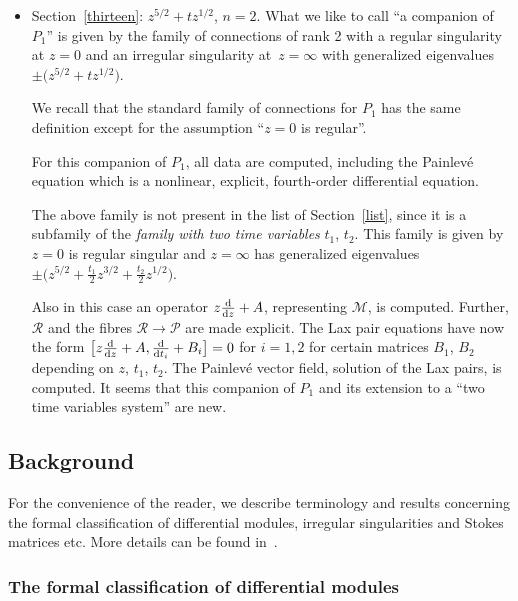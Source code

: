 \documentclass[10pt,a4paper]{amsart}
\numberwithin{equation}{section}
\begin{document}
\begin{itemize}
 For $n=3$, we claim an identification with an item in the classification
 by Kawakami~\cite[p.~35]{K3}.

\item Section~\ref{thirteen}: $z^{5/2}+tz^{1/2}$, $n=2$.
What we like to call ``a companion of $P_1$'' is given by the family of connections of rank 2 with a regular singularity
at $z=0$ and an irregular singularity at~${z=\infty}$ with generalized eigenvalues $\pm \bigl(z^{5/2}+tz^{1/2}\bigr)$.

We recall that the standard family of connections for $P_1$ has the same definition except for the assumption
``$z=0$ is regular''.

 For this companion of $P_1$, all data are computed, including the Painlev\'e equation which is a nonlinear, explicit,
 fourth-order differential equation.

 The above family is not present in the list of Section~\ref{list}, since it is a subfamily of the {\it family
 with two time variables } $t_1$, $t_2$. This family is given by $z=0$ is regular singular and $z=\infty$ has generalized eigenvalues $\pm \bigl( z^{5/2}+\frac{t_1}{2}z^{3/2}+\frac{t_2}{2}z^{1/2} \bigr)$.

 Also in this case an operator $z\frac{{\rm d}}{{\rm d}z}+A$, representing $\mathcal{M}$, is computed. Further, $\mathcal{R}$ and the fibres $\mathcal{R}\rightarrow \mathcal{P}$ are made explicit. The Lax pair equations have now the form $\bigl[\smash{z\frac{{\rm d}}{{\rm d}z}+A, \frac{{\rm d}}{{\rm d}t_i}}+B_i\bigr]=0$ for $i=1,2$ for certain matrices $B_1$, $B_2$ depending on $z$, $t_1$, $t_2$. The Painlev\'e vector field, solution of the Lax pairs, is computed.
 It seems that this companion of $P_1$ and its extension to a ``two time variables system'' are new.
 \end{itemize}

\subsection{Background}
For the convenience of the reader, we describe terminology and results concerning the
formal classification of differential modules, irregular singularities and Stokes matrices etc.
More details can be found in~\cite{vdP-Si}.

\subsubsection{The formal classification of differential modules}
\end{document}
